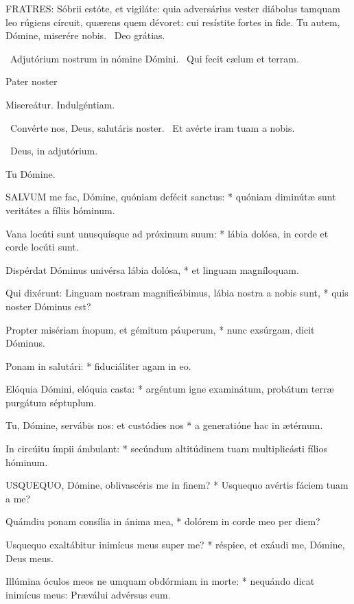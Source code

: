 \lettrine[lines=2]{F}{RATRES}: Sóbrii estóte, et vigiláte: quia adversárius vester diábolus tamquam leo rúgiens círcuit, quærens quem dévoret: cui resístite fortes in fide. Tu autem, Dómine, miserére nobis. \R\ Deo grátias.

\V\ Adjutórium nostrum in nómine Dómini. \R\ Qui fecit cælum et terram.

Pater noster 

 Misereátur. Indulgéntiam.

\V\ Convérte nos, Deus, salutáris noster. \R\ Et avérte iram tuam a nobis.

\V\ Deus, in adjutórium.

 Tu Dómine.


\lettrine[lines=2]{S}{ALVUM} me fac, Dómine, quóniam defécit sanctus: * quóniam diminútæ sunt veritátes a fíliis hóminum.

Vana locúti sunt unusquísque ad próximum suum: * lábia dolósa, in corde et corde locúti sunt.

Dispérdat Dóminus univérsa lábia dolósa, * et linguam magníloquam.

Qui dixérunt: Linguam nostram magnificábimus, lábia nostra a nobis sunt, * quis noster Dóminus est?

Propter misériam ínopum, et gémitum páuperum, * nunc exsúrgam, dicit Dóminus.

Ponam in salutári: * fiduciáliter agam in eo.

Elóquia Dómini, elóquia casta: * argéntum igne examinátum, probátum terræ purgátum séptuplum.

Tu, Dómine, servábis nos: et custódies nos * a generatióne hac in ætérnum.

In circúitu ímpii ámbulant: * secúndum altitúdinem tuam multiplicásti fílios hóminum.


\lettrine[lines=2]{U}{SQUEQUO}, Dómine, oblivascéris me in finem? * Usquequo avértis fáciem tuam a me?

Quámdiu ponam consília in ánima mea, * dolórem in corde meo per diem?

Usquequo exaltábitur inimícus meus super me? * réspice, et exáudi me, Dómine, Deus meus.

Illúmina óculos meos ne umquam obdórmiam in morte: * nequándo dicat inimícus meus: Præválui advérsus eum.

